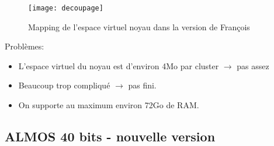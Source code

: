 \documentclass[t]{beamer}
\begin{document}
      \begin{frame}{\subsecname}
        \begin{figure}
          \texttt{[image: decoupage]}
          \caption{Mapping de l'espace virtuel noyau dans la version de François}
        \end{figure}
      \end{frame}

      \begin{frame}{\subsecname}
        \vspace{2cm}
      Problèmes:
        \begin{itemize}
          \item L'espace virtuel du noyau est d'environ 4Mo par cluster \newline $\rightarrow$ pas
                assez
          \item Beaucoup trop compliqué $\rightarrow$ pas fini. 
          \item On supporte au maximum environ 72Go de RAM. \\
        \end{itemize}
      \end{frame}

    \subsection{ALMOS 40 bits - nouvelle version}
\end{document}

